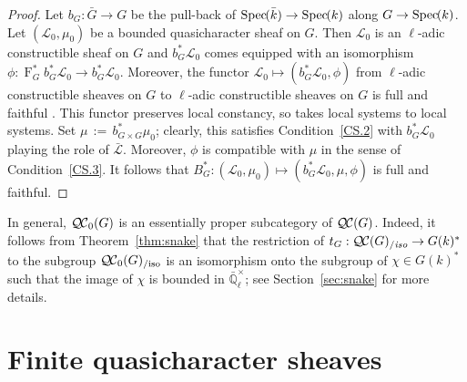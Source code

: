 \documentclass[11pt]{amsart}
\theoremstyle{plain}
\theoremstyle{definition}
\theoremstyle{remark}
\newcommand{\Spec}[1]{{\operatorname{Spec}\hskip-1pt( #1 )}}
\newcommand{\EE}{\mathbb{\bar Q}_\ell}
\newcommand{\bFq}{\bar{k}}
\newcommand{\Fq}{k}
\newcommand{\EEx}{\EE^\times}
\newcommand{\Frob}[1]{\operatorname{F}_{#1}}
\newcommand{\ceq}{{\, :=\, }}
\newcommand{\qcs}[1]{{\mathcal{#1}}}
\newcommand{\gqcs}[1]{{\mathcal{\bar #1}}}
\newcommand{\QC}{{\mathcal{Q\hskip-0.8pt C}}}
\newcommand{\QCb}{{\QC_0}}
\newcommand{\QCiso}[1]{\QC(#1)_{/\textit{iso}}}
\newcommand{\QCbiso}[1]{\QCb(#1)_{/\text{iso}}}
\newcommand{\trFrob}[1]{t_{#1}}
\begin{document}
\begin{proof}
 Let $b_G : {\bar G} \to G$ be the pull-back of $\Spec{\bFq} \to \Spec{\Fq}$ along $G\to \Spec{\Fq}$.
 Let $(\qcs{L}_0,\mu_0)$ be a bounded quasicharacter sheaf on $G$. 
 Then $\qcs{L}_0$ is an $\ell$-adic constructible sheaf on $G$ and
 $b_G^* \qcs{L}_0$ comes equipped with an isomorphism 
 $\phi : \Frob{G}^* b_G^*\qcs{L}_0 \to b_G^* \qcs{L}_0$.
 Moreover, the functor $\qcs{L}_0 \mapsto (b_G^* \qcs{L}_0,\phi)$  
 from $\ell$-adic constructible sheaves on $G$ to $\ell$-adic constructible sheaves on $G$
 is full and faithful . 
 This functor preserves local constancy, so takes local systems to local systems. 
 Set $\mu \ceq b_{G\times G}^*\mu_0$; clearly, this satisfies Condition~\ref{CS.2} 
 with $b_G^*\qcs{L}_0$ playing the role of $\gqcs{L}$.
 Moreover, $\phi$ is compatible with $\mu$ in the sense of Condition~\ref{CS.3}.
 It follows that $B_G^* : (\qcs{L}_0,\mu_0) \mapsto (b_G^*\qcs{L}_0,\mu, \phi)$
 is full and faithful.
\end{proof}

In general, $\QCb(G)$ is an essentially
proper subcategory of $\QC(G)$. Indeed, it follows from Theorem~\ref{thm:snake}
that the restriction of $\trFrob{G} : \QCiso{G} \to G(\Fq)^*$ to the subgroup
$\QCbiso{G}$ is an isomorphism onto the subgroup of $\chi \in G(\Fq)^*$ such
that the image of $\chi$ is bounded in $\EEx$; see Section~\ref{sec:snake} for more details.

\section{Finite quasicharacter sheaves}\label{sec:finite}

 
\end{document}
